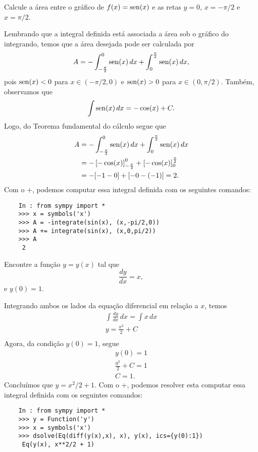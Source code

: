 \begin{exeresol}
  Calcule a área entre o gráfico de $f(x) = \operatorname{sen}(x)$ e as retas $y=0$, $x=-\pi/2$ e $x=\pi/2$.
\end{exeresol}
\begin{resol}
  Lembrando que a integral definida está associada a área sob o gráfico do integrando, temos que a área desejada pode ser calculada por
  \begin{equation}
    A = - \int_{-\frac{\pi}{2}}^0 \operatorname{sen}(x)\,dx + \int_0^{\frac{\pi}{2}} \operatorname{sen}(x)\,dx,
  \end{equation}
  pois $\operatorname{sen}(x) < 0$ para $x\in (-\pi/2, 0)$ e $\operatorname{sen}(x) > 0$ para $x\in (0, \pi/2)$.
  Também, observamos que
  \begin{equation}
    \int \operatorname{sen}(x)\,dx = -\cos(x) + C.
  \end{equation}
  Logo, do Teorema fundamental do cálculo segue que
  \begin{align}
    A &= - \int_{-\frac{\pi}{2}}^0 \operatorname{sen}(x)\,dx + \int_0^{\frac{\pi}{2}} \operatorname{sen}(x)\,dx \\
      &= -\left[-\cos(x)\right]_{-\frac{\pi}{2}}^0 + \left[-\cos(x)\right]_0^{\frac{\pi}{2}} \\
      &= -[-1 - 0] + [-0 - (-1)] = 2. 
  \end{align}
  \ifispython
  Com o {\python}+{\sympy}, podemos computar essa integral definida com os seguintes comandos:
  \begin{lstlisting}
    In : from sympy import *
    >>> x = symbols('x')
    >>> A = -integrate(sin(x), (x,-pi/2,0))
    >>> A += integrate(sin(x), (x,0,pi/2))
    >>> A
     2
  \end{lstlisting}
  \fi  
\end{resol}

\begin{exeresol}
  Encontre a função $y = y(x)$ tal que
  \begin{equation}
    \frac{dy}{dx} = x,
  \end{equation}
  e $y(0) = 1$.
\end{exeresol}
\begin{resol}
  Integrando ambos os lados da equação diferencial em relação a $x$, temos
  \begin{gather}
    \int \frac{dy}{dx}\,dx = \int x\,dx \\
    y = \frac{x^2}{2} + C \\
  \end{gather}
  Agora, da condição $y(0) = 1$, segue
  \begin{gather}
    y(0) = 1 \\
    \frac{0^2}{2} + C = 1 \\
    C = 1.
  \end{gather}
  Concluímos que $y = x^2/2 + 1$.
  \ifispython
  Com o {\python}+{\sympy}, podemos resolver esta computar essa integral definida com os seguintes comandos:
  \begin{lstlisting}
    In : from sympy import *
    >>> y = Function('y')
    >>> x = symbols('x')
    >>> dsolve(Eq(diff(y(x),x), x), y(x), ics={y(0):1})
     Eq(y(x), x**2/2 + 1)
  \end{lstlisting}
  \fi  
\end{resol}

